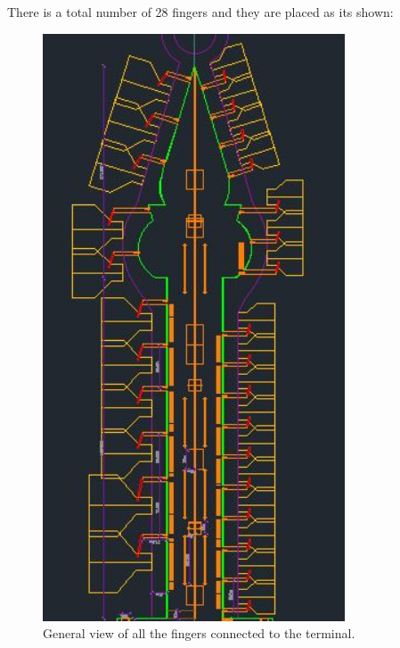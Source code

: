 	There is a total number of 28 fingers and they are placed as its shown:

	\begin{figure}[H]
		\centering
		\includegraphics[clip, trim=0cm 0cm 0cm 0cm, angle=90, width=0.8\textwidth]{./images/serviceway/fingers}
		\caption{General view of all the fingers connected to the terminal.} %
		\label{} %
	\end{figure} 
	
